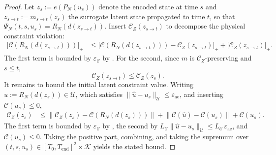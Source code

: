 \documentclass[a4paper,fleqn]{cas-sc}
\theoremstyle{thmstyleone}%
\theoremstyle{thmstyletwo}%
\theoremstyle{thmstylethree}%
\begin{document}
\begin{proof}
Let $z_s := e(P_N(u_s))$ denote the encoded state at time $s$ and
$z_{s \to t} := m_{s\to t}(z_s)$ the surrogate latent state propagated to time $t$, so that
$\Psi_{N}(t,s,u_s) = R_N(d(z_{s \to t}))$. Insert
$\mathcal{C}_Z(z_{s \to t})$ to decompose the physical constraint violation:
\begin{align*}
\bigl[\mathcal{C}(R_N(d(z_{s \to t})))\bigr]_+
&\leq
\bigl[\mathcal{C}(R_N(d(z_{s \to t})))
- \mathcal{C}_Z(z_{s \to t})\bigr]_+
+ \bigl[\mathcal{C}_Z(z_{s \to t})\bigr]_+.
\end{align*}
The first term is bounded by $\varepsilon_{\mathcal{C}}$
by . For the second, since  $m$ is $\mathcal{C}_Z$-preserving and $s \leq t$,
\[
    \mathcal{C}_Z(z_{s \to t})  \leq \mathcal{C}_Z(z_s).
\]
It remains to bound the initial latent constraint
value. Writing
$\hat{u} := R_N(d(z_s)) \in \mathcal{U}$,
which satisfies
$\|\hat{u} - u_s\|_{\mathcal{U}} \leq
\varepsilon_{\mathrm{ae}}$, and inserting
$\mathcal{C}(u_s) \leq 0$,
\begin{align*}
\mathcal{C}_Z(z_s)
&\leq
\bigl\|\mathcal{C}_Z(z_s)
- \mathcal{C}(R_N(d(z_s)))\bigr\|
+ \bigl\|\mathcal{C}(\hat{u})
- \mathcal{C}(u_s)\bigr\|
+ \mathcal{C}(u_s).
\end{align*}
The first term is bounded by $\varepsilon_{\mathcal{C}}$
by , the second by
$L_{\mathcal{C}}\|\hat{u} - u_s\|_{\mathcal{U}}
\leq L_{\mathcal{C}}\,\varepsilon_{\mathrm{ae}}$,
and $\mathcal{C}(u_s) \leq 0$. Taking the positive part, combining, and taking the supremum over
$(t,s,u_s) \in [T_0,T_{\mathrm{end}}]^2 \times \mathcal K$ yields the stated bound.
\end{proof}
\end{document}
